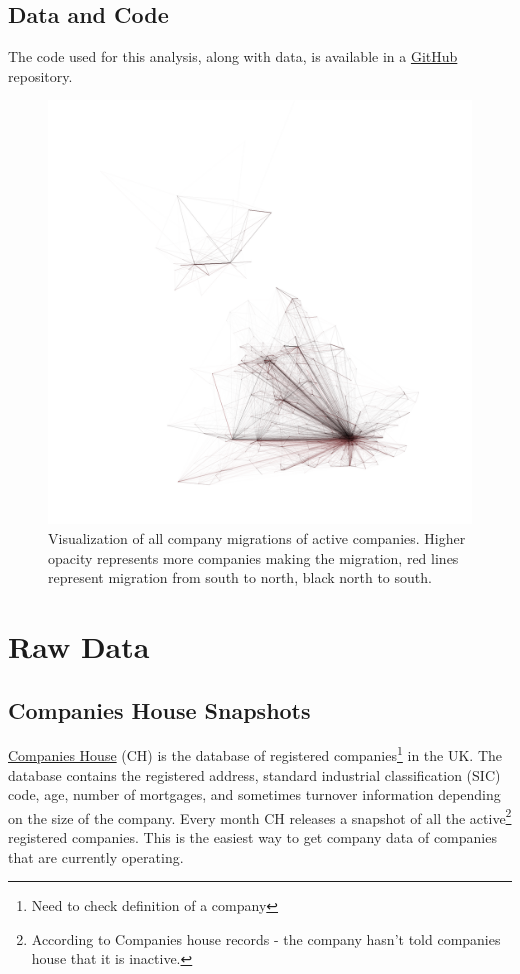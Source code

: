 \documentclass[a4paper,10pt]{article}
\begin{document}
\subsection*{Data and Code}
The code used for this analysis, along with data, is available in a \href{https://github.com/alfredholmes/abm_job_locations}{GitHub} repository. 
\begin{figure}[ht]
 \includegraphics[width=\textwidth]{graphics/visualisation}
 \caption{Visualization of all company migrations of active companies. Higher opacity represents more companies making the migration, red lines represent migration from south to north, black north to south.}
\end{figure}

\section{Raw Data}
\subsection{Companies House Snapshots}
\href{https://www.gov.uk/government/organisations/companies-house}{Companies House} (CH) is the database of registered companies\footnote{Need to check definition of a company} in the UK. The database contains the registered address, standard industrial classification (SIC) code, age, number of mortgages, and sometimes turnover information depending on the size of the company. Every month CH releases a snapshot of all the active\footnote{According to Companies house records - the company hasn't told companies house that it is inactive.} registered companies. This is the easiest way to get company data of companies that are currently operating.
\end{document}
